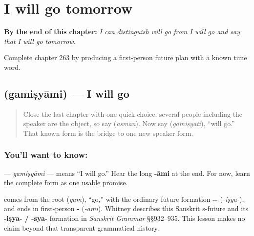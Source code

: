 
\chapter{I will go tomorrow}
\label{ch:sa-first-person-future-going}

\begin{chapteropening}
\textbf{By the end of this chapter:} \emph{I can distinguish will go from I will go and say that I will go tomorrow.}

Complete chapter 263 by producing a first-person future plan with a known time word.
\end{chapteropening}

\section[\texorpdfstring{\sk{गमिष्यामि} (gamiṣyāmi)}{गमिष्यामि (gamiṣyāmi)}]{ (gamiṣyāmi) — I will go}

\label{lesson:SA-C263-gamisyami}



\begin{quote}
Close the last chapter with one quick choice: several people including the speaker are the object, so say \textbf{} (\emph{asmān}). Now say \textbf{} (\emph{gamiṣyati}), “will go.” That known form is the bridge to one new speaker form.
\end{quote}

\subsection*{You'll want to know: }
\textbf{} — \emph{gamiṣyāmi} — means “I will go.” Hear the long \textbf{-āmi} at the end. For now, learn the complete form as one usable promise.

\begin{cousinweb}
\textbf{} comes from the root \textbf{} (\emph{gam}), “go,” with the ordinary future formation \textbf{--} (\emph{-iṣya-}), and ends in first-person \textbf{-} (\emph{-āmi}). Whitney describes this Sanskrit s-future and its \textbf{-iṣya- / -sya-} formation in \emph{Sanskrit Grammar} §§932–935. This lesson makes no claim beyond that transparent grammatical history.
\end{cousinweb}

